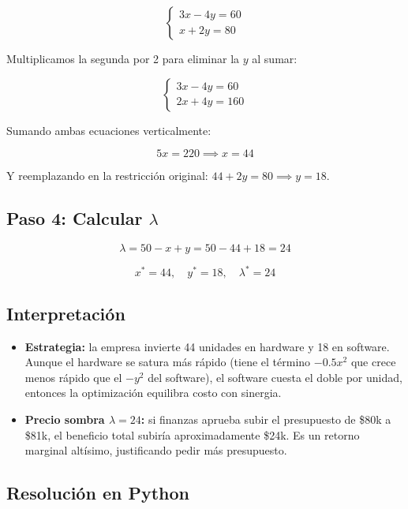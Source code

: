 \documentclass[12pt]{article}
\begin{document}
\[
\begin{cases}
3x - 4y = 60 \\
x + 2y = 80
\end{cases}
\]

Multiplicamos la segunda por 2 para eliminar la $y$ al sumar:

\[
\begin{cases}
3x - 4y = 60 \\
2x + 4y = 160
\end{cases}
\]

Sumando ambas ecuaciones verticalmente:

\[
5x = 220 \implies x = 44
\]

Y reemplazando en la restricción original: $44 + 2y = 80 \implies y = 18$.

\subsection{Paso 4: Calcular $\lambda$}

\[
\lambda = 50 - x + y = 50 - 44 + 18 = 24
\]

\[
\boxed{x^* = 44, \quad y^* = 18, \quad \lambda^* = 24}
\]

\subsection{Interpretación}

\begin{itemize}
    \item \textbf{Estrategia:} la empresa invierte 44 unidades en hardware y 18 en software. Aunque el hardware se satura más rápido (tiene el término $-0.5x^2$ que crece menos rápido que el $-y^2$ del software), el software cuesta el doble por unidad, entonces la optimización equilibra costo con sinergia.
    \item \textbf{Precio sombra $\lambda = 24$:} si finanzas aprueba subir el presupuesto de \$80k a \$81k, el beneficio total subiría aproximadamente \$24k. Es un retorno marginal altísimo, justificando pedir más presupuesto.
\end{itemize}

\subsection{Resolución en Python}
\end{document}

